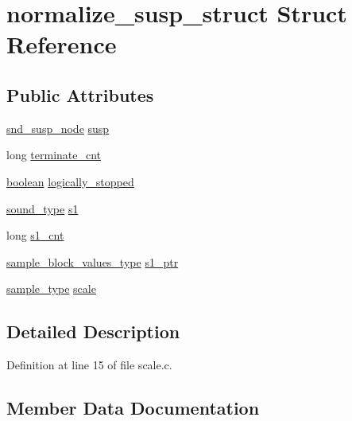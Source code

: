 \hypertarget{structnormalize__susp__struct}{}\section{normalize\+\_\+susp\+\_\+struct Struct Reference}
\label{structnormalize__susp__struct}
\subsection*{Public Attributes}
\begin{DoxyCompactItemize}
\item 
\hyperlink{sound_8h_a6b268203688a934bd798ceb55f85d4c0}{snd\+\_\+susp\+\_\+node} \hyperlink{structnormalize__susp__struct_a0ddeda48adaf69ca12a1450052dbcb81}{susp}
\item 
long \hyperlink{structnormalize__susp__struct_a0b9132183c5c8b80d6b092b3156f45b9}{terminate\+\_\+cnt}
\item 
\hyperlink{cext_8h_a7670a4e8a07d9ebb00411948b0bbf86d}{boolean} \hyperlink{structnormalize__susp__struct_a1fe93aa176088fc7f5640f7c9835ea21}{logically\+\_\+stopped}
\item 
\hyperlink{sound_8h_a792cec4ed9d6d636d342d9365ba265ea}{sound\+\_\+type} \hyperlink{structnormalize__susp__struct_a11fb76b27a21d4e4a1752974128351c4}{s1}
\item 
long \hyperlink{structnormalize__susp__struct_a98562f537c1ef7b0456553700354b5d0}{s1\+\_\+cnt}
\item 
\hyperlink{sound_8h_a83d17f7b465d1591f27cd28fc5eb8a03}{sample\+\_\+block\+\_\+values\+\_\+type} \hyperlink{structnormalize__susp__struct_ae47eebb4d58f3e1643c5ad1223498597}{s1\+\_\+ptr}
\item 
\hyperlink{sound_8h_a3a9d1d4a1c153390d2401a6e9f71b32c}{sample\+\_\+type} \hyperlink{structnormalize__susp__struct_ad3ea5692b717ce392c20f5080ee12801}{scale}
\end{DoxyCompactItemize}


\subsection{Detailed Description}


Definition at line 15 of file scale.\+c.



\subsection{Member Data Documentation}
